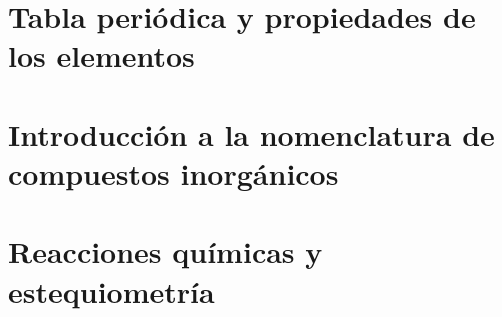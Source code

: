 \documentclass{../summarie}
\begin{document}
    \chapter{Tabla periódica y propiedades de los elementos} 
    \chapter{Introducción a la nomenclatura de compuestos inorgánicos} 
    \chapter{Reacciones químicas y estequiometría} 


\backmatter
\end{document}
